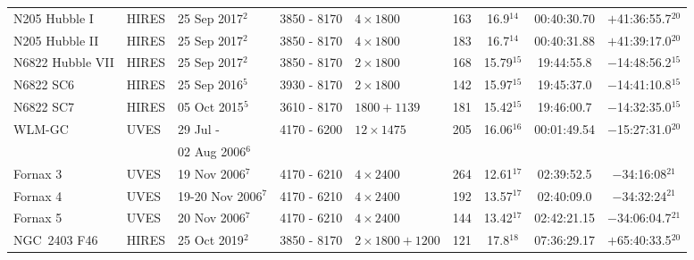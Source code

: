 \documentclass{aa}
\begin{document}
\begin{appendix}
\begin{table*}[h!]
{\begin{tabular}{llllllccc}
N205 Hubble I & HIRES & 25 Sep 2017$^{2}$ & 3850 - 8170 & $4\times1800$ & 163  & 16.9$^{14}$ & 00:40:30.70 & $+$41:36:55.7$^{20}$ \\
N205 Hubble II & HIRES & 25 Sep 2017$^{2}$ & 3850 - 8170 & $4\times1800$ & 183  & 16.7$^{14}$ & 00:40:31.88 & $+$41:39:17.0$^{20}$ \\
N6822 Hubble VII & HIRES & 25 Sep 2017$^{2}$ & 3850 - 8170 & $2\times1800$ & 168  & 15.79$^{15}$ & 19:44:55.8 & $-$14:48:56.2$^{15}$\\
N6822 SC6 & HIRES & 25 Sep 2016$^{5}$ & 3930 - 8170 & $2\times1800$ & 142  & 15.97$^{15}$ & 19:45:37.0 & $-$14:41:10.8$^{15}$ \\
N6822 SC7 & HIRES & 05 Oct 2015$^{5}$ & 3610 - 8170 & $1800+1139$ & 181  & 15.42$^{15}$ & 19:46:00.7 & $-$14:32:35.0$^{15}$ \\
WLM-GC & UVES & 29 Jul -  & 4170 - 6200 & $12\times1475$ & 205  & 16.06$^{16}$ & 00:01:49.54 & $-$15:27:31.0$^{20}$ \\
 & & 02 Aug 2006$^{6}$ \\
Fornax 3 & UVES &  19 Nov 2006$^{7}$ & 4170 - 6210 & $4\times2400$ & 264  & 12.61$^{17}$ & 02:39:52.5 & $-$34:16:08$^{21}$ \\
Fornax 4 & UVES &  19-20 Nov 2006$^{7}$ & 4170 - 6210 & $4\times2400$ & 192  & 13.57$^{17}$ & 02:40:09.0 & $-$34:32:24$^{21}$ \\
Fornax 5 & UVES &  20 Nov 2006$^{7}$ & 4170 - 6210 & $4\times2400$ & 144  & 13.42$^{17}$ & 02:42:21.15 & $-$34:06:04.7$^{21}$ \\
NGC~2403 F46 & HIRES & 25 Oct 2019$^{2}$ & 3850 - 8170 & $2\times1800+1200$ & 121  & 17.8$^{18}$ & 07:36:29.17 & $+$65:40:33.5$^{20}$ \\
\hline
\end{tabular}
}
\end{table*}


\end{appendix}
\end{document}
